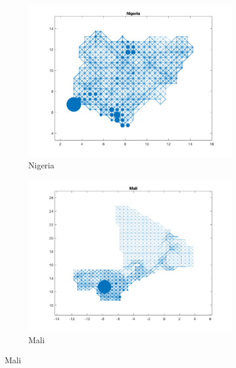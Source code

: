 \documentclass[11pt, oneside]{article}   	%
\begin{document}
\begin{figure}[p]
\begin{subfigure}[c]{0.45\textwidth}
\includegraphics[width=\textwidth, trim={2cm 1cm 1.5cm 0cm},clip]{../../Build/output/Matlab_graphs/Nicer_graphs/Nigeria_stat.png}
\caption{Nigeria}
\label{fig:nigeria_mat}
\end{subfigure}
\begin{subfigure}[c]{0.45\textwidth}
\includegraphics[width=\textwidth, trim={2cm 1cm 1.5cm 0cm},clip]{../../Build/output/Matlab_graphs/Nicer_graphs/Mali_stat.png}
\caption{Mali}
\label{fig:Mali_mat}
\end{subfigure}


\end{figure}
\end{document}
